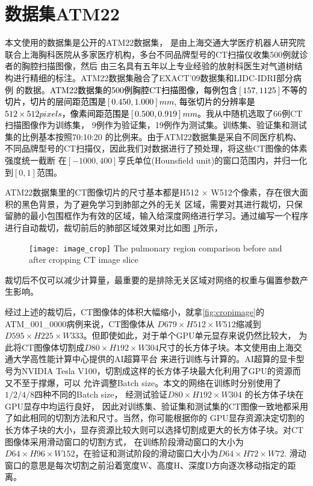 \section{数据集ATM22}\label{sec:ATM22dataset}\label{sec:ATM22}
本文使用的数据集是公开的ATM22数据集\cite{Zhang2022CFDA, Zhang2021Airway, Yu2022Bronchi, Qin2019AirwayNet}，
是由上海交通大学医疗机器人研究院联合上海胸科医院从多家医疗机构，多台不同品牌型号的CT扫描仪收集500例就诊者的胸腔扫描图像，然后
由三名具有五年以上专业经验的放射科医生对气道树结构进行精细的标注。ATM22数据集融合了EXACT'09数据集和LIDC-IDRI部分病例
的数据。\textcolor{black}{ATM22数据集的500例胸腔CT扫描图像，每例包含$[157, 1125]$不等的切片\cite{zhang2023multisite}，切片的层间距范围是$[0.450, 1.000]mm$, 
每张切片的分辨率是$512 \times 512 pixels$，像素间距范围是$[0.500, 0.919]mm$。}我从中随机选取了66例CT扫描图像作为训练集， 9例作为验证集，19例作为测试集。训练集、验证集和测试集的比例基本按照70:10:20
的比例来。由于ATM22数据集是采自不同医疗机构、不同品牌型号的CT扫描仪，因此我们对数据进行了预处理，将这些CT图像的体素强度统一截断
在$[-1000, 400]$亨氏单位(Hounsfield unit)的窗口范围内，并归一化到$[0, 1]$范围。

ATM22数据集里的CT图像切片的尺寸基本都是H512 $\times$ W512个像素，存在很大面积的黑色背景，为了避免学习到肺部之外的无关
区域，需要对其进行裁切，只保留肺的最小包围框作为有效的区域，输入给深度网络进行学习。通过编写一个程序进行自动裁切，裁切前后的肺部区域效果对比如图
\ref{fig:cropimage}所示，
\begin{figure}[htbp]
    \centering
    \texttt{[image: image\_crop]}
    	{The pulmonary region comparison before and after cropping CT image slice}
    \label{fig:cropimage}
\end{figure}
裁切后不仅可以减少计算量，最重要的是排除无关区域对网络的权重与偏置参数产生影响。

经过上述的裁切后，CT图像体的体积大幅缩小，就拿\autoref{fig:cropimage}的ATM\_001\_0000病例来说，CT图像体从
$D679 \times H512 \times W512$缩减到$D595 \times H225 \times W333$。但即使如此，对于单个GPU单元显存来说仍然比较大，
为此将CT图像体切割成$D80 \times H192 \times W304$尺寸的长方体子块。本文使用由上海交通大学高性能计算中心提供的AI超算平台
来进行训练与计算的。AI超算的显卡型号为NVIDIA Tesla V100，切割成这样的长方体子块最大化利用了GPU的资源而又不至于撑爆，可以
允许调整Batch size。本文的网络在训练时分别使用了$1 / 2 / 4 / 8$四种不同的Batch size， 经测试验证$D80 \times H192 \times W304$
的长方体子块在GPU显存中均运行良好， 因此对训练集、验证集和测试集的CT图像一致地都采用了如此相同的切割方法和尺寸。当然，你可能根据你的
GPU显存资源决定切割的长方体子块的大小，显存资源比较大则可以选择切割成更大的长方体子块。对CT图像体采用滑动窗口的切割方式，
在训练阶段滑动窗口的大小为$D64 \times H96 \times W152$，在验证和测试阶段的滑动窗口大小为$D64 \times H72 \times W72$.
滑动窗口的意思是每次切割之前沿着宽度W、高度H、深度D方向逐次移动指定的距离。

